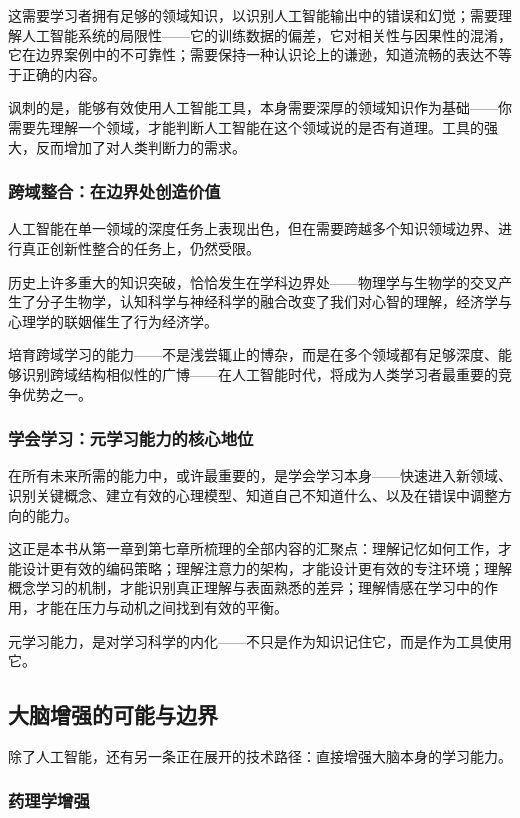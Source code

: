 \documentclass[11pt]{article}
\begin{document}
这需要学习者拥有足够的领域知识，以识别人工智能输出中的错误和幻觉；需要理解人工智能系统的局限性——它的训练数据的偏差，它对相关性与因果性的混淆，它在边界案例中的不可靠性；需要保持一种认识论上的谦逊，知道流畅的表达不等于正确的内容。

讽刺的是，能够有效使用人工智能工具，本身需要深厚的领域知识作为基础——你需要先理解一个领域，才能判断人工智能在这个领域说的是否有道理。工具的强大，反而增加了对人类判断力的需求。
\subsubsection{跨域整合：在边界处创造价值}
\label{sec:org8ede5ef}

人工智能在单一领域的深度任务上表现出色，但在需要跨越多个知识领域边界、进行真正创新性整合的任务上，仍然受限。

历史上许多重大的知识突破，恰恰发生在学科边界处——物理学与生物学的交叉产生了分子生物学，认知科学与神经科学的融合改变了我们对心智的理解，经济学与心理学的联姻催生了行为经济学。

培育跨域学习的能力——不是浅尝辄止的博杂，而是在多个领域都有足够深度、能够识别跨域结构相似性的广博——在人工智能时代，将成为人类学习者最重要的竞争优势之一。
\subsubsection{学会学习：元学习能力的核心地位}
\label{sec:orga63dda3}

在所有未来所需的能力中，或许最重要的，是学会学习本身——快速进入新领域、识别关键概念、建立有效的心理模型、知道自己不知道什么、以及在错误中调整方向的能力。

这正是本书从第一章到第七章所梳理的全部内容的汇聚点：理解记忆如何工作，才能设计更有效的编码策略；理解注意力的架构，才能设计更有效的专注环境；理解概念学习的机制，才能识别真正理解与表面熟悉的差异；理解情感在学习中的作用，才能在压力与动机之间找到有效的平衡。

元学习能力，是对学习科学的内化——不只是作为知识记住它，而是作为工具使用它。
\subsection{大脑增强的可能与边界}
\label{sec:org065ec04}

除了人工智能，还有另一条正在展开的技术路径：直接增强大脑本身的学习能力。
\subsubsection{药理学增强}
\label{sec:orgd4134e7}
\end{document}
